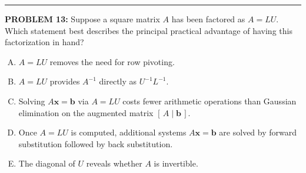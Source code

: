 \documentclass[12pt]{amsart}
\newcommand{\divider}{
  \vspace{-1em} %
  \noindent
  \raisebox{-0.15ex}{\textbullet}%
  \hspace{0.5em}%
  \rule[0.5ex]{0.95\textwidth}{1.0pt}%
  \hspace{0.5em}%
  \raisebox{-0.15ex}{\textbullet}%
  \vspace{0em} %
}
\begin{document}
\divider

{\bf PROBLEM 13:}
Suppose a square matrix $A$ has been factored as $A = LU$. Which statement best describes the principal practical advantage of having this factorization in hand?

\begin{enumerate}[(A)]
\item $A = LU$ removes the need for row pivoting.
\item $A = LU$ provides $A^{-1}$ directly as $U^{-1}L^{-1}$.
\item Solving $A\mathbf{x} = \mathbf{b}$ via $A = LU$ costs fewer arithmetic operations than Gaussian elimination on the augmented matrix $[\,A \mid \mathbf{b}\,]$.
\item Once $A = LU$ is computed, additional systems $A\mathbf{x} = \mathbf{b}$ are solved by forward substitution followed by back substitution.
\item The diagonal of $U$ reveals whether $A$ is invertible.
\end{enumerate}
\end{document}
